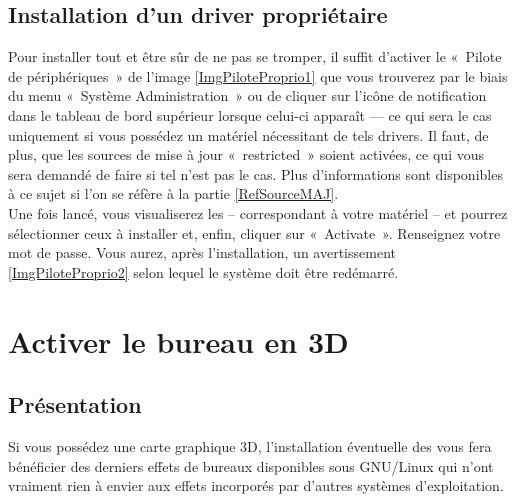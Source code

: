 \subsection{Installation d'un driver propriétaire}
\label{RefInstallDriverProprietaire}
Pour installer tout   et être sûr de ne pas se tromper, il suffit d'activer le «~Pilote de périphériques~» de l'image \ref{ImgPiloteProprio1} que vous trouverez par le biais du menu «~Système \FlecheDroite Administration~» ou de cliquer sur l'icône de notification dans le tableau de bord supérieur lorsque celui-ci apparaît --- ce qui sera le cas uniquement si vous possédez un matériel nécessitant de tels drivers. Il faut, de plus, que les sources de mise à jour «~restricted~» soient activées, ce qui vous sera demandé de faire si tel n'est pas le cas. Plus d'informations sont disponibles à ce sujet si l'on se réfère à la partie \ref{RefSourceMAJ}.\\
Une fois lancé, vous visualiserez les   -- correspondant à votre matériel -- et pourrez sélectionner ceux à installer et, enfin, cliquer sur «~Activate~». Renseignez votre mot de passe. Vous aurez, après l'installation, un avertissement \ref{ImgPiloteProprio2} selon lequel le système doit être redémarré.
\PiloteProprio
\section{Activer le bureau en 3D}
\label{RefBureau3D}
\subsection{Présentation}
Si vous possédez une carte graphique 3D, l'installation éventuelle  des   vous fera bénéficier des derniers effets de bureaux disponibles sous GNU/Linux qui n'ont vraiment rien à envier aux effets incorporés par d'autres systèmes d'exploitation.\par
